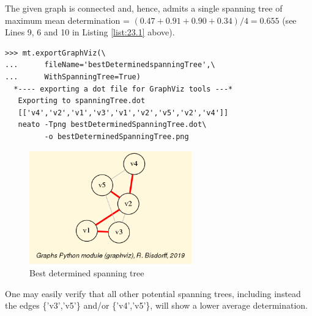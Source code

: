 The given graph is connected and, hence, admits a single spanning tree of maximum mean determination = $(0.47 + 0.91 + 0.90 + 0.34)/4 = 0.655$ (see Lines 9, 6 and 10 in Listing \ref{list:23.1} above).
\begin{lstlisting}
>>> mt.exportGraphViz(\
...      fileName='bestDeterminedspanningTree',\
...      WithSpanningTree=True)
  *---- exporting a dot file for GraphViz tools ---*
   Exporting to spanningTree.dot
   [['v4','v2','v1','v3','v1','v2','v5','v2','v4']]
   neato -Tpng bestDeterminedSpanningTree.dot\
         -o bestDeterminedSpanningTree.png
\end{lstlisting}
\begin{figure}[h]
\sidecaption
\includegraphics[width=7cm]{Figures/bestDeterminedSpanningTree.png}
\caption{Best determined spanning tree} 
\label{fig:23.7}       %
\end{figure}

One may easily verify that all other potential spanning trees, including instead the edges \{'v3','v5'\} and/or \{'v4','v5'\}, will show a lower average determination.
 
